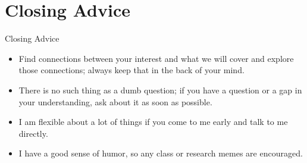 \documentclass[aspectratio=169]{beamer}
\begin{document}
\section{Closing Advice}

\begin{frame}{Closing Advice}
    \begin{itemize}
        \item Find connections between your interest and what we will cover and explore those connections; always keep that in the back of your mind.
        \item There is no such thing as a dumb question; if you have a question or a gap in your understanding, ask about it as soon as possible.
        \item I am flexible about a lot of things if you come to me early and talk to me directly.
        \item I have a good sense of humor, so any class or research memes are encouraged.
    \end{itemize}
\end{frame}
\end{document}
